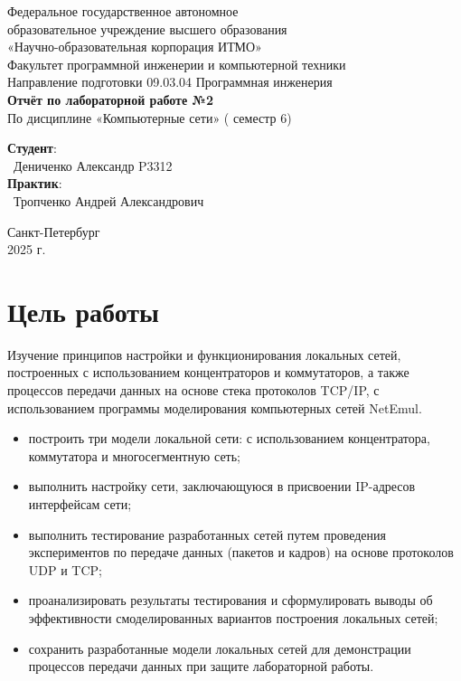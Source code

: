 \documentclass{article}
\begin{document}
\begin{center}
    \Large
    Федеральное государственное автономное \\
    образовательное учреждение высшего образования \\ 
    «Научно-образовательная корпорация ИТМО»\\
    \vspace{0.5cm}
    \large
    Факультет программной инженерии и компьютерной техники \\
    Направление подготовки 09.03.04 Программная инженерия \\
    \vspace{1cm}
    \Large
    \textbf{Отчёт по лабораторной работе №2} \\
        По дисциплине «Компьютерные сети» ( семестр 6)\\
    \large
    \vspace{8cm}

    \begin{minipage}{.33\textwidth}
    \end{minipage}
    \hfill
    \begin{minipage}{.4\textwidth}
    
        \textbf{Студент}: \vspace{.1cm} \\
        \ Дениченко Александр P3312\\
        \textbf{Практик}:  \\
        \ Тропченко Андрей Александрович
    \end{minipage}
    \vfill
Санкт-Петербург\\ 2025 г.
\end{center}
\pagestyle{empty}
\newpage
\pagestyle{plain}

\section*{Цель работы}
Изучение принципов настройки и функционирования локальных сетей,
построенных с использованием концентраторов и коммутаторов, а также
процессов передачи данных на основе стека протоколов TCP/IP, с
использованием программы моделирования компьютерных сетей NetEmul.
\begin{itemize}
    \item построить три модели локальной сети: с использованием концентратора,
    коммутатора и многосегментную сеть;
    \item выполнить настройку сети, заключающуюся в присвоении IP-адресов
    интерфейсам сети;
    \item выполнить тестирование разработанных сетей путем проведения
    экспериментов по передаче данных (пакетов и кадров) на основе
    протоколов UDP и TCP;
    \item проанализировать результаты тестирования и сформулировать выводы об
    эффективности смоделированных вариантов построения локальных сетей;
    \item сохранить разработанные модели локальных сетей для демонстрации
    процессов передачи данных при защите лабораторной работы.
\end{itemize}
\end{document}
